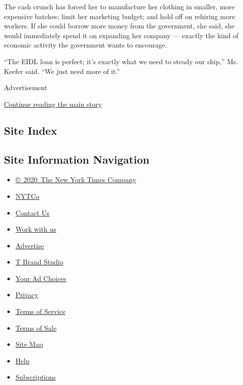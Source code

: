 The cash crunch has forced her to manufacture her clothing in smaller,
more expensive batches; limit her marketing budget; and hold off on
rehiring more workers. If she could borrow more money from the
government, she said, she would immediately spend it on expanding her
company --- exactly the kind of economic activity the government wants
to encourage.

``The EIDL loan is perfect; it's exactly what we need to steady our
ship,'' Ms. Keefer said. ``We just need more of it.''

Advertisement

\protect\hyperlink{after-bottom}{Continue reading the main story}

\hypertarget{site-index}{%
\subsection{Site Index}\label{site-index}}

\hypertarget{site-information-navigation}{%
\subsection{Site Information
Navigation}\label{site-information-navigation}}

\begin{itemize}
\tightlist
\item
  \href{https://help.nytimes3xbfgragh.onion/hc/en-us/articles/115014792127-Copyright-notice}{©~2020~The
  New York Times Company}
\end{itemize}

\begin{itemize}
\tightlist
\item
  \href{https://www.nytco.com/}{NYTCo}
\item
  \href{https://help.nytimes3xbfgragh.onion/hc/en-us/articles/115015385887-Contact-Us}{Contact
  Us}
\item
  \href{https://www.nytco.com/careers/}{Work with us}
\item
  \href{https://nytmediakit.com/}{Advertise}
\item
  \href{http://www.tbrandstudio.com/}{T Brand Studio}
\item
  \href{https://www.nytimes3xbfgragh.onion/privacy/cookie-policy\#how-do-i-manage-trackers}{Your
  Ad Choices}
\item
  \href{https://www.nytimes3xbfgragh.onion/privacy}{Privacy}
\item
  \href{https://help.nytimes3xbfgragh.onion/hc/en-us/articles/115014893428-Terms-of-service}{Terms
  of Service}
\item
  \href{https://help.nytimes3xbfgragh.onion/hc/en-us/articles/115014893968-Terms-of-sale}{Terms
  of Sale}
\item
  \href{https://spiderbites.nytimes3xbfgragh.onion}{Site Map}
\item
  \href{https://help.nytimes3xbfgragh.onion/hc/en-us}{Help}
\item
  \href{https://www.nytimes3xbfgragh.onion/subscription?campaignId=37WXW}{Subscriptions}
\end{itemize}
